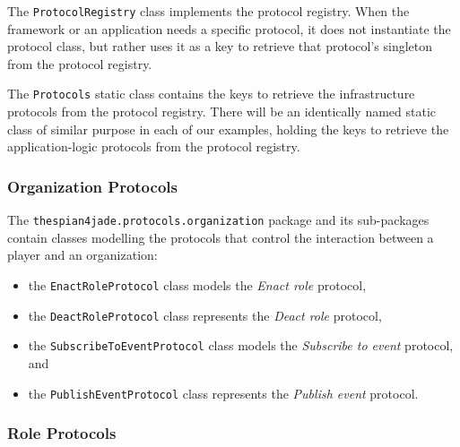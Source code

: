 The \texttt{ProtocolRegistry} class implements the protocol registry.
When the framework or an application needs a specific protocol, it does not instantiate the protocol class, but rather uses it as a key to retrieve that protocol's singleton from the protocol registry. 

The \texttt{Protocols} static class contains the keys to retrieve the infrastructure protocols from the protocol registry.
There will be an identically named static class of similar purpose in each of our examples, holding the keys to retrieve the application-logic protocols from the protocol registry. 

\subsubsection{Organization Protocols}

The \texttt{thespian4jade.protocols.organization} package and its sub-packages contain classes modelling the protocols that control the interaction between a player and an organization:
\begin{itemize}
	\item the \texttt{EnactRoleProtocol} class models the \textit{Enact role} protocol,
	\item the \texttt{DeactRoleProtocol} class represents the \textit{Deact role} protocol,
	\item the \texttt{SubscribeToEventProtocol} class models the \textit{Subscribe to event} protocol, and
	\item the \texttt{PublishEventProtocol} class represents the \textit{Publish event} protocol.
\end{itemize}

\subsubsection{Role Protocols}

